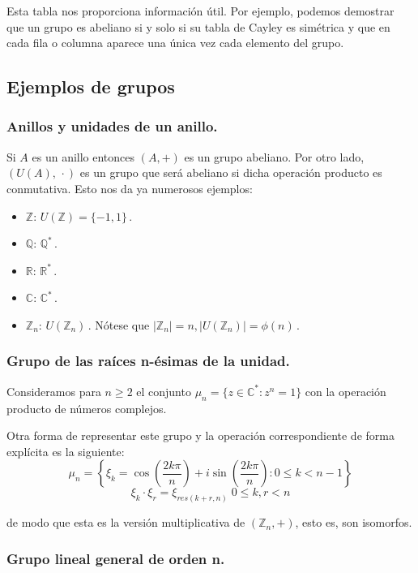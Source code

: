 Esta tabla nos proporciona información útil. Por ejemplo, podemos demostrar que un grupo es abeliano si y solo si su tabla de Cayley es simétrica y que en cada fila o columna aparece una única vez cada elemento del grupo.

\subsection{Ejemplos de grupos}

\subsubsection{Anillos y unidades de un anillo.}

Si $A$ es un anillo entonces $(A,+)$ es un grupo abeliano. Por otro lado, $(U(A),\,\cdot)$ es un grupo que será abeliano si dicha operación producto es conmutativa. Esto nos da ya numerosos ejemplos:

\begin{itemize}
  \item $\mathbb{Z}$: $U\left(\mathbb{Z}\right)=\{-1,1\}$\,.
  \item $\mathbb{Q}$: $\mathbb{Q}^{*}$\,.
  \item $\mathbb{R}$: $\mathbb{R}^{*}$\,.
  \item $\mathbb{C}$: $\mathbb{C}^{*}$\,.
  \item $\mathbb{Z}_n$: $U\left(\mathbb{Z}_n\right)$\,. Nótese que $|\mathbb{Z}_n| = n,|U\left(\mathbb{Z}_n\right)| = \phi(n)$\,.
\end{itemize}

\subsubsection{Grupo de las raíces n-ésimas de la unidad.}

Consideramos para $n \ge 2$ el conjunto $\mu_n = \{z \in \mathbb{C}^{*} : z^n = 1\}$ con la operación producto de números complejos. 

Otra forma de representar este grupo y la operación correspondiente de forma explícita es la siguiente:
$$\mu_n = \left\{\xi_k = \cos\left(\frac{2k\pi}{n}\right)+i\sin\left(\frac{2k\pi}{n}\right) : 0 \le k < n-1 \right\}$$
$$\xi_k \cdot \xi_r = \xi_{res(k+r,n)} \; 0 \le k,r < n$$

de modo que esta es la versión multiplicativa de $(\mathbb{Z}_n,+)$, esto es, son isomorfos.

\subsubsection{Grupo lineal general de orden n.}

